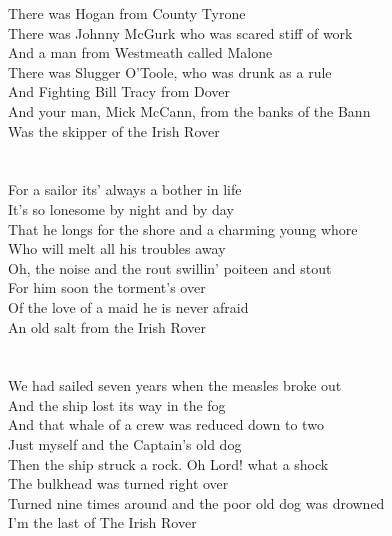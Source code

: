 There was Hogan from County Tyrone\\
There was Johnny McGurk who was scared stiff of work\\
And a man from Westmeath called Malone\\
There was Slugger O'Toole, who was drunk as a rule\\
And Fighting Bill Tracy from Dover\\
And your man, Mick McCann, from the banks of the Bann\\
Was the skipper of the Irish Rover\\
~\\
~\\
For a sailor its' always a bother in life\\
It's so lonesome by night and by day\\
That he longs for the shore and a charming young whore \\
Who will melt all his troubles away\\
Oh, the noise and the rout swillin' poiteen and stout\\
For him soon the torment's over\\
Of the love of a maid he is never afraid\\
An old salt from the Irish Rover\\
~\\
~\\
We had sailed seven years when the measles broke out\\
And the ship lost its way in the fog\\
And that whale of a crew was reduced down to two\\
Just myself and the Captain's old dog\\
Then the ship struck a rock. Oh Lord! what a shock\\
The bulkhead was turned right over\\
Turned nine times around and the poor old dog was drowned\\
I'm the last of The Irish Rover
